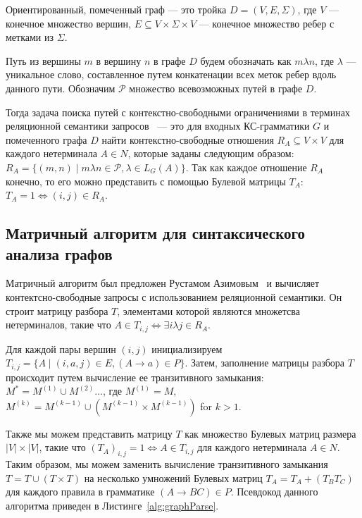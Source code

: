 \documentclass[12pt]{matmex-diploma-custom}
\begin{document}
Ориентированный, помеченный граф --- это тройка $D = (V, E, \Sigma)$, где $V$ --- конечное множество вершин, $E \subseteq V \times \Sigma \times V$ --- конечное множество ребер с метками из $\Sigma$.

Путь из вершины $m$ в вершину $n$ в графе $D$ будем обозначать как $m \lambda n$, где $\lambda$ --- уникальное слово, составленное путем конкатенации всех меток ребер вдоль данного пути. 
Обозначим $\mathcal{P}$ множество всевозможных путей в графе $D$.

Тогда задача поиска путей с контекстно-свободными ограничениями в терминах реляционной семантики запросов~\cite{hellings2015querying} --- это для входных КС-грамматики $G$ и помеченного графа $D$ найти контекстно-свободные отношения $R_A \subseteq V \times V$ для каждого нетерминала $A \in N$, которые заданы следующим образом: $R_A = \{ (m, n) \mid m \lambda n \in \mathcal{P}, \lambda \in L_G(A)\}$. 
Так как каждое отношение $R_A$ конечно, то его можно представить с помощью Булевой матрицы $T_A$: 
$T_A = 1 \Leftrightarrow (i, j) \in R_A$.

\subsection{Матричный алгоритм для синтаксического анализа графов}

Матричный алгоритм был предложен Рустамом Азимовым~\cite{azimov2018context} и вычисляет контектсно-свободные запросы с использованием реляционной семантики.
Он строит матрицу разбора $T$, элементами которой являются множетсва нетерминалов, такие что $A \in T_{i, j} \Leftrightarrow \exists i\lambda j \in R_A$.

Для каждой пары вершин $(i, j)$ инициализируем $T_{i, j} = \{ A \mid (i, a, j) \in E, (A \to a) \in P\}$.
Затем, заполнение матрицы разбора $T$ происходит путем вычисление ее транзитивного замыкания: $M^* = M^{(1)} \cup M^{(2)} \dots$, где $M^{(1)} = M$, $M^{(k)} = M^{(k-1)} \cup (M^{(k-1)} \times M^{(k-1)})$ for $k > 1$.

Также мы можем представить  матрицу $T$ как множество Булевых матриц размера $|V| \times |V|$, такие что $(T_A)_{i, j} = 1 \Leftrightarrow A \in T_{i, j}$ для каждого нетерминала $A \in N$.
Таким образом, мы можем заменить вычисление транзитивного замыкания $T = T \cup (T \times T)$ на несколько умножений Булевых матриц $T_A = T_A + (T_B T_C)$ для каждого правила в грамматике $(A \to BC) \in P$.
Псевдокод данного алгоритма приведен в Листинге~\ref{alg:graphParse}.
\end{document}
